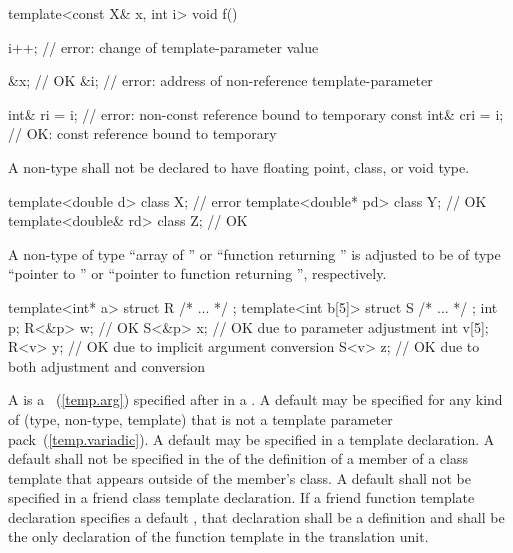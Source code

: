 \begin{codeblock}
template<const X& x, int i> void f() {
  i++;                          // error: change of template-parameter value

  &x;                           // OK
  &i;                           // error: address of non-reference template-parameter

  int& ri = i;                  // error: non-const reference bound to temporary
  const int& cri = i;           // OK: const reference bound to temporary
}
\end{codeblock}
\exitexample

\pnum
A non-type
shall not be declared to have floating point, class, or void type.
\enterexample

\begin{codeblock}
template<double d> class X;     // error
template<double* pd> class Y;   // OK
template<double& rd> class Z;   // OK
\end{codeblock}
\exitexample

\pnum
A non-type
of type ``array of
''
or ``function returning
''
is adjusted to be of type
``pointer to
''
or ``pointer to function returning
'',
respectively.
\enterexample

\begin{codeblock}
template<int* a>   struct R { /* ... */ };
template<int b[5]> struct S { /* ... */ };
int p;
R<&p> w;                        // OK
S<&p> x;                        // OK due to parameter adjustment
int v[5];
R<v> y;                         // OK due to implicit argument conversion
S<v> z;                         // OK due to both adjustment and conversion
\end{codeblock}
\exitexample

\pnum
A
is a
~(\ref{temp.arg}) specified after
\tcode{=}
in a
.
A default
may be specified for any kind of
(type, non-type, template)
that is not a template parameter pack~(\ref{temp.variadic}).
A default
may be specified in a template declaration.
A default
shall not be specified in the
of the definition of a member of a class template that appears outside
of the member's class.
A default
shall not be specified in a friend class template declaration.
If a friend function template declaration
specifies a default
,
that declaration shall be a definition and shall be the only declaration of
the function template in the translation unit.

